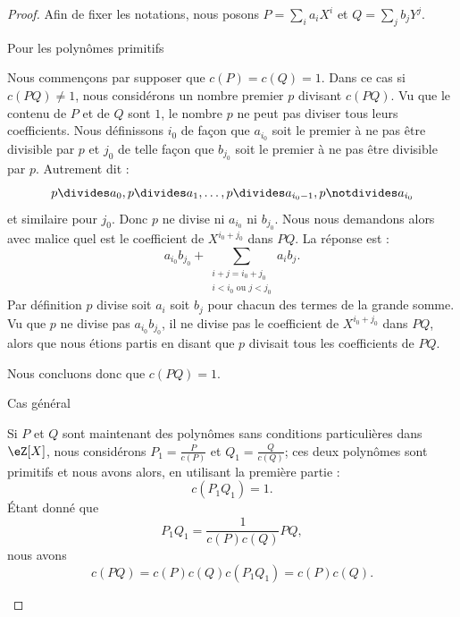 \begin{proof}
    Afin de fixer les notations, nous posons \( P=\sum_ia_iX^i\) et \( Q=\sum_jb_jY^j\).

    \begin{subproof}
        \item[Pour les polynômes primitifs]

            Nous commençons par supposer que \( c(P)=c(Q)=1\). Dans ce cas si \( c(PQ)\neq 1\), nous considérons un nombre premier \( p\) divisant \( c(PQ)\). Vu que le contenu de \( P\) et de \( Q\) sont \( 1\), le nombre \( p\) ne peut pas diviser tous leurs coefficients. Nous définissons \( i_0\) de façon que \( a_{i_0}\) soit le premier à ne pas être divisible par \( p\) et \( j_0\) de telle façon que \( b_{j_0}\) soit le premier à ne pas être divisible par \( p\). Autrement dit :
            \begin{equation}
                p\divides a_0,p\divides a_1,\ldots,p\divides a_{i_0-1},p\notdivides a_{i_0}
            \end{equation}
            et similaire pour \( j_0\). Donc \( p\) ne divise ni \( a_{i_0}\) ni \( b_{j_0}\). Nous nous demandons alors avec malice quel est le coefficient de \( X^{i_0+j_0}\) dans \( PQ\). La réponse est :
            \begin{equation}
                a_{i_0}b_{j_0}+\sum_{\substack{i+j=i_0+j_0\\i<i_0\text{ ou }j<j_0}}a_ib_j.
            \end{equation}
            Par définition \( p\) divise soit \( a_i\) soit \( b_j\) pour chacun des termes de la grande somme. Vu que \( p\) ne divise pas \( a_{i_0}b_{j_0}\), il ne divise pas le coefficient de \( X^{i_0+j_0}\) dans \( PQ\), alors que nous étions partis en disant que \( p\) divisait tous les coefficients de \( PQ\).

            Nous concluons donc que \( c(PQ)=1\).

        \item[Cas général]

            Si \( P\) et \( Q\) sont maintenant des polynômes sans conditions particulières dans \( \eZ[X]\), nous considérons \( P_1=\frac{ P }{ c(P) }\) et \( Q_1=\frac{ Q }{ c(Q) }\); ces deux polynômes sont primitifs et nous avons alors, en utilisant la première partie :
            \begin{equation}
                c(P_1Q_1)=1.
            \end{equation}
            Étant donné que
            \begin{equation}
                P_1Q_1=\frac{1}{ c(P)c(Q) }PQ,
            \end{equation}
            nous avons
            \begin{equation}
                c(PQ)=c(P)c(Q)c(P_1Q_1)=c(P)c(Q).
            \end{equation}
    \end{subproof}
\end{proof}

